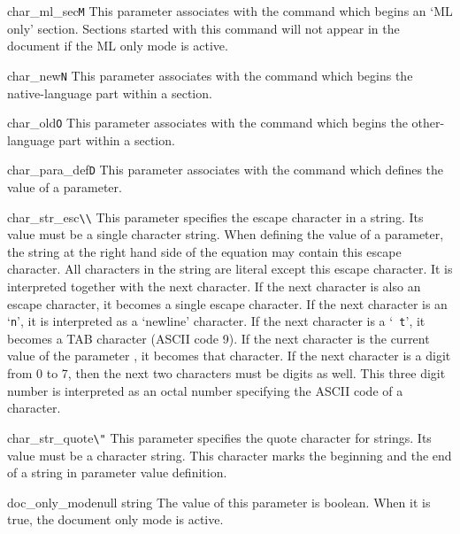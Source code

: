 \begin{describepara}{char_ml_sec}{\verb*|M|}\describe
This parameter associates with the  command
which begins an `ML only' section. Sections started with this command
will not appear in the document if the ML only mode is active.
\end{describepara}
\begin{describepara}{char_new}{\verb*|N|}\describe
This parameter associates with the  command
which begins the native-language part within a section. 
\end{describepara}
\begin{describepara}{char_old}{\verb*|O|}\describe
This parameter associates with the  command
which begins the other-language part within a section. 
\end{describepara}
\begin{describepara}{char_para_def}{\verb*|D|}\describe
This parameter associates with the  command
which defines the value of a parameter.
\end{describepara}
\begin{describepara}{char_str_esc}{\verb*|\\|}\describe
This parameter specifies the escape character in a string. Its value must
be a single character string. When defining the value of a parameter,
the string at the right hand side of the equation may contain this
escape character. All characters in the string are literal except this
escape character. It is interpreted together with the next character.
If the next character is also an escape character, it becomes a single
escape character. If the next character is an `{\tt n}', it is
interpreted as a `newline' character. If the next character is a `{\tt
t}', it becomes a TAB character (ASCII code 9). If the next character
is the current value of the parameter , it
becomes that character. If the next character is a digit
from 0 to 7, then the next two characters must be digits as well. This
three digit number is interpreted as an octal number specifying the
ASCII code of a character.
\end{describepara}
\begin{describepara}{char_str_quote}{\verb*|\"|}\describe
This parameter specifies the quote character for strings. Its value
must be a character string. This character marks the beginning and the
end of a string in parameter value definition.
\end{describepara}
\begin{describepara}{doc_only_mode}{null string}\describe
The value of this parameter is boolean. When it is true, the document
only mode is active.
\end{describepara}
